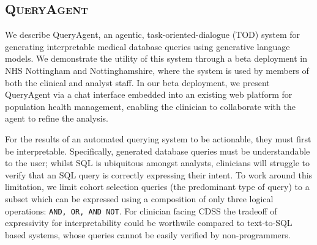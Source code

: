 \documentclass[11pt]{article}
\begin{document}



\subsection{\textsc{QueryAgent}}
We describe QueryAgent, an agentic, task-oriented-dialogue (TOD) system for generating interpretable medical database queries using generative language models. We demonstrate the utility of this system through a beta deployment in NHS Nottingham and Nottinghamshire, where the system is used by members of both the clinical and analyst staff.
In our beta deployment, we present QueryAgent via a chat interface embedded into an existing web platform for population health management, enabling the clinician to collaborate with the agent to refine the analysis. %

For the results of an automated querying system to be actionable, they must first be interpretable. Specifically, generated database queries must be understandable to the user; whilst SQL is ubiquitous amongst analysts, clinicians will struggle to verify that an SQL query is correctly expressing their intent. To work around this limitation, we limit cohort selection queries (the predominant type of query) to a subset which can be expressed using a composition of only three logical operations: \texttt{AND, OR, AND NOT}. For clinician facing CDSS the tradeoff of expressivity for interpretability could be worthwile compared to text-to-SQL based systems, whose queries cannot be easily verified by non-programmers.

\end{document}
